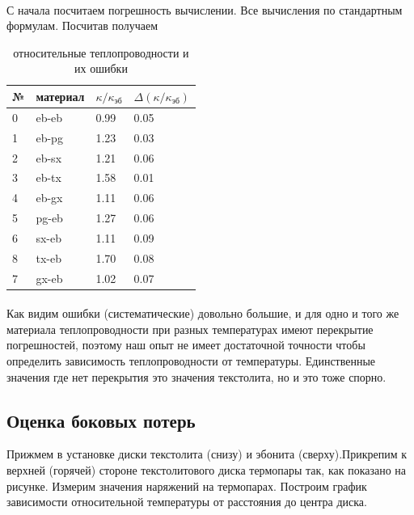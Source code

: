 \documentclass[a4paper, 12pt]{article}
\begin{document}
    \paragraph{}
    С начала посчитаем погрешность вычислении. Все вычисления по стандартным формулам. Посчитав получаем

    \begin{table}[h]
        \begin{center}
        \begin{tabular}{|l|l|ll|}
        \hline
        {№} & материал &    $\kappa / \kappa_{эб}$ & $\Delta(\kappa / \kappa_{эб})$ \\
        \hline
        0 &    eb-eb &  0.99 &  0.05 \\\hline
        1 &    eb-pg &  1.23 &  0.03 \\
        2 &    eb-sx &  1.21 &  0.06 \\
        3 &    eb-tx &  1.58 &  0.01 \\
        4 &    eb-gx &  1.11 &  0.06 \\\hline
        5 &    pg-eb &  1.27 &  0.06 \\
        6 &    sx-eb &  1.11 &  0.09 \\
        8 &    tx-eb &  1.70 &  0.08 \\
        7 &    gx-eb &  1.02 &  0.07 \\
        \hline
        \end{tabular}

        \end{center}
        \caption{относительные теплопроводности и их ошибки}
    \end{table}

    \paragraph{}
    Как видим ошибки (систематические) довольно большие, и для одно и того же материала теплопроводности при разных температурах имеют перекрытие погрешностей, поэтому наш опыт не имеет достаточной точности чтобы определить зависимость теплопроводности от температуры. Единственные значения где нет перекрытия это значения текстолита, но и это тоже спорно.

    \subsection{Оценка боковых потерь}

    Прижмем в установке диски текстолита (снизу) и эбонита (сверху).Прикрепим к верхней (горячей) стороне текстолитового диска термопары так, как показано на рисунке. Измерим значения наряжений на термопарах. Построим график зависимости относительной температуры от расстояния до центра диска.
\end{document}
